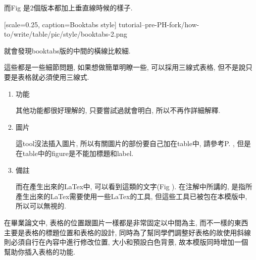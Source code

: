   而Fig 是2個版本都加上垂直線時候的樣子.

    {
      [scale=0.25,
      caption={Booktabs style}]
      {tutorial--pre-PH-fork/how-to/write/table/pic/style/booktabs-2.png}
    }

  就會發現booktabs版的中間的橫線比較細.

  這些都是一些細節問題, 如果想做簡單明瞭一些, 可以採用三線式表格, 但不是說只要是表格就必須使用三線式.

{}

  \begin{enumerate}

  \item
  {
    功能

    其他功能都很好理解的, 只要嘗試過就會明白, 所以不再作詳細解釋.
  } %

  \item
  {
    圖片

    這tool沒法插入圖片, 所以有關圖片的部份要自己加在table中, 請參考P. , 但是在table中的figure是不能加標題和label.
  } %

  \item
  {
    備註

    而在產生出來的LaTex中, 可以看到這類的文字(Fig ). 在注解中所講的, 是指所產生出來的LaTex需要使用一些LaTex的工具, 但這些工具已被包在本模版中, 所以可以無視的.

  } %
  \end{enumerate}

\newpage
{}

在畢業論文中, 表格的位置跟圖片一樣都是非常固定以中間為主, 而不一樣的東西主要是表格的標題位置和表格的設計, 同時為了幫同學們調整好表格的故使用斜線則必須自行在內容中進行修改位置, 大小和預設白色背景, 故本模版同時增加一個幫助你插入表格的功能.\\

